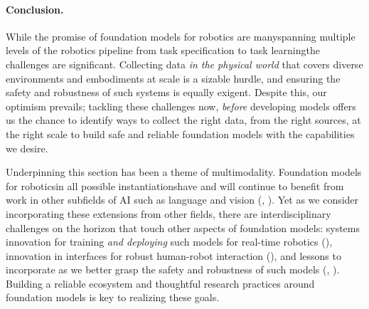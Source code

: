\paragraph{Conclusion.} While the promise of foundation models for robotics are many\dash{}spanning multiple levels of the robotics pipeline from task specification to task learning\dash{}the challenges are significant. Collecting data \textit{in the physical world} that covers diverse environments and embodiments at scale is a sizable hurdle, and ensuring the safety and robustness of such systems is equally exigent. Despite this, our optimism prevails; tackling these challenges now, \textit{before} developing models offers us the chance to identify ways to collect the right data, from the right sources, at the right scale to build safe and reliable foundation models with the capabilities we desire. 

Underpinning this section has been a theme of multimodality. Foundation models for robotics\dash{}in all possible instantiations\dash{}have and will continue to benefit from work in other subfields of AI such as language and vision (, ). Yet as we consider incorporating these extensions from other fields, there are interdisciplinary challenges on the horizon that touch other aspects of foundation models: systems innovation for training \textit{and deploying} such models for real-time robotics (), innovation in interfaces for robust human-robot interaction (), and lessons to incorporate as we better grasp the safety and robustness of such models (, ). Building a reliable ecosystem and thoughtful research practices around foundation models is key to realizing these goals.




